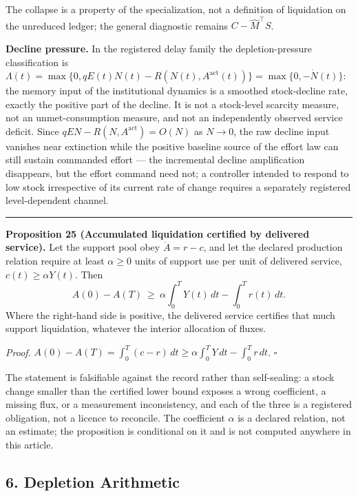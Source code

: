 \documentclass[11pt]{article}
\begin{document}
The collapse is a property of the specialization, not a definition of
liquidation on the unreduced ledger; the general diagnostic remains
\(C - \widehat{M}^\top S\).

\textbf{Decline pressure.} In the registered delay family the
depletion-pressure classification is
\(\Lambda(t) = \max\{0, qE(t)N(t) - R(N(t), A^{\mathrm{act}}(t))\} = \max\{0, -\dot N(t)\}\):
the memory input of the institutional dynamics is a smoothed
stock-decline rate, exactly the positive part of the decline. It is not
a stock-level scarcity measure, not an unmet-consumption measure, and
not an independently observed service deficit. Since
\(qEN - R(N, A^{\mathrm{act}}) = O(N)\) as \(N \to 0\), the raw decline
input vanishes near extinction while the positive baseline source of the
effort law can still sustain commanded effort --- the incremental
decline amplification disappears, but the effort command need not; a
controller intended to respond to low stock irrespective of its current
rate of change requires a separately registered level-dependent channel.

\begin{center}\rule{0.5\linewidth}{0.5pt}\end{center}

\textbf{Proposition 25 (Accumulated liquidation certified by delivered service).} Let the support pool
obey \(\dot A=r-c\), and let the declared production relation require at least \(\alpha\ge0\) units
of support use per unit of delivered service, \(c(t)\ge\alpha Y(t)\). Then
\[ A(0)-A(T)\ \ge\ \alpha\int_0^TY(t)\,dt-\int_0^Tr(t)\,dt . \]
Where the right-hand side is positive, the delivered service certifies that much support liquidation,
whatever the interior allocation of fluxes.

\emph{Proof.} \(A(0)-A(T)=\int_0^T(c-r)\,dt\ge\alpha\int_0^TY\,dt-\int_0^Tr\,dt\). \ensuremath{\square}

The statement is falsifiable against the record rather than self-sealing: a stock change smaller than
the certified lower bound exposes a wrong coefficient, a missing flux, or a measurement inconsistency,
and each of the three is a registered obligation, not a licence to reconcile. The coefficient
\(\alpha\) is a declared relation, not an estimate; the proposition is conditional on it and is not
computed anywhere in this article.


\subsection{6. Depletion Arithmetic}\label{depletion-arithmetic}
\end{document}
